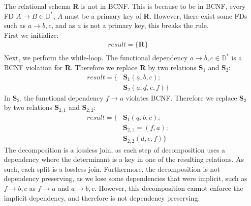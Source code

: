 \documentclass[letterpaper]{article}
\theoremstyle{plain}
\theoremstyle{definition}
\theoremstyle{remark}
\begin{document}
\subsubsection{}
The relational schema \textbf{R} is not in BCNF. This is because to be in BCNF, every FD $A\to B\in\mathbb{D}^*$, $A$ must be a primary key of \textbf{R}. However, there exist some FDs such as $a\to b,c$, and as $a$ is not a primary key, this breaks the rule.\\[1em]
First we initialize:
\begin{align*}
    \textit{result}=\{\textbf{R}\}\\
\end{align*}
Next, we perform the while-loop. The functional dependency $a\to b,c\in\mathbb{D}^*$ is a BCNF violation for \textbf{R}. Therefore we replace \textbf{R} by two relations $\textbf{S}_1$ and $\textbf{S}_2$:
\begin{align*}
    \textit{result}=\{&\textbf{S}_1(\underline{a},b,c);\\
    &\textbf{S}_2(a,\underline{d},e,f)\}
\end{align*}
In $\textbf{S}_2$, the functional dependency $f\to a$ violates BCNF. Therefore we replace $\textbf{S}_2$ by two relations $\textbf{S}_{2,1}$ and $\textbf{S}_{2,2}$:
\begin{align*}
    \textit{result}=\{&\textbf{S}_1(\underline{a},b,c);\\
    &\textbf{S}_{2,1}=(\underline{f},a);\\
    &\textbf{S}_{2,2}(\underline{d},e,f)\}
\end{align*}
The decomposition is a lossless join, as each step of decomposition uses a dependency where the determinant is a key in one of the resulting relations. As such, each split is a lossless join. Furthermore, the decomposition is not dependency preserving, as we lose some dependencies that were implicit, such as $f\to b,c$ as $f\to a$ and $a\to b,c$. However, this decomposition cannot enforce the implicit dependency, and therefore is not dependency preserving.
\end{document}
